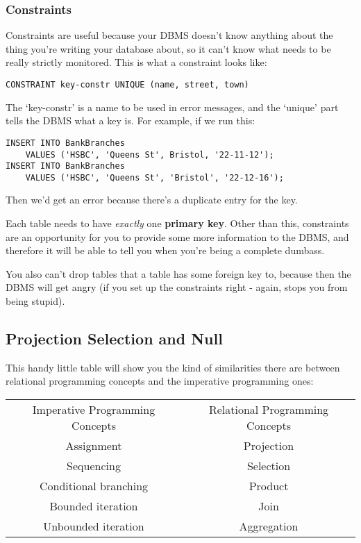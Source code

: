 \documentclass[11pt,a4paper,titlepage,dvipsnames,cmyk]{scrartcl}
\begin{document}
\subsubsection{Constraints}%
\label{ssub:Constraints}
Constraints are useful because your DBMS doesn't know anything about the
thing you're writing your database about, so it can't know what needs to
be really strictly monitored. This is what a constraint looks like:

\begin{lstlisting}[]
CONSTRAINT key-constr UNIQUE (name, street, town)
\end{lstlisting}

The `key-constr' is a name to be used in error messages, and the `unique'
part tells the DBMS what a key is. For example, if we run this:

\begin{lstlisting}[]
INSERT INTO BankBranches
    VALUES ('HSBC', 'Queens St', Bristol, '22-11-12');
INSERT INTO BankBranches
    VALUES ('HSBC', 'Queens St', 'Bristol', '22-12-16');
\end{lstlisting}

Then we'd get an error because there's a duplicate entry for the key.

Each table needs to have \textit{exactly} one \textbf{primary key}. Other
than this, constraints are an opportunity for you to provide some more
information to the DBMS, and therefore it will be able to tell you when
you're being a complete dumbass.

You also can't drop tables that a table has some foreign key to, because
then the DBMS will get angry (if you set up the constraints right - again,
stops you from being stupid).

\subsection{Projection Selection and Null}%
\label{sub:projection}
This handy little table will show you the kind of similarities there are
between relational programming concepts and the imperative programming
ones:

\begin{center}
    \begin{tabular}{c|c}
        Imperative Programming Concepts & Relational Programming Concepts
        \\
        \hhline{=|=}
        Assignment & Projection \\
        Sequencing & Selection \\
        Conditional branching & Product \\
        Bounded iteration & Join \\
        Unbounded iteration & Aggregation
    \end{tabular}
\end{center}
\end{document}
